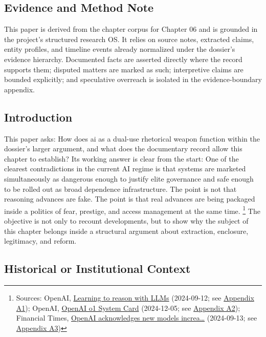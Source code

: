 \documentclass[
  american,
  11pt,
  letterpaper,
]{article}
\begin{document}
\subsection{Evidence and Method Note}\label{evidence-and-method-note-6}

This paper is derived from the chapter corpus for Chapter 06 and is
grounded in the project's structured research OS. It relies on source
notes, extracted claims, entity profiles, and timeline events already
normalized under the dossier's evidence hierarchy. Documented facts are
asserted directly where the record supports them; disputed matters are
marked as such; interpretive claims are bounded explicitly; and
speculative overreach is isolated in the evidence-boundary appendix.

\subsection{Introduction}\label{introduction-6}

This paper asks: How does ai as a dual-use rhetorical weapon function
within the dossier's larger argument, and what does the documentary
record allow this chapter to establish? Its working answer is clear from
the start: One of the clearest contradictions in the current AI regime
is that systems are marketed simultaneously as dangerous enough to
justify elite governance and safe enough to be rolled out as broad
dependence infrastructure. The point is not that reasoning advances are
fake. The point is that real advances are being packaged inside a
politics of fear, prestige, and access management at the same time.
\footnote{Sources: OpenAI,
  \href{https://openai.com/index/learning-to-reason-with-llms/}{Learning
  to reason with LLMs} (2024-09-12; see
  \hyperref[ch-06-appendix-a1-learning-to-reason-with-llms]{Appendix
  A1}); OpenAI,
  \href{https://openai.com/index/openai-o1-system-card/}{OpenAI o1
  System Card} (2024-12-05; see
  \hyperref[ch-06-appendix-a2-openai-o1-system-card]{Appendix A2});
  Financial Times,
  \href{https://www.ft.com/content/37ba7236-2a64-4807-b1e1-7e21ee7d0914}{OpenAI
  acknowledges new models increa\ldots{}} (2024-09-13; see
  \hyperref[ch-06-appendix-a3-openai-acknowledges-new-models-increase-risk-of-misuse-to-create-bioweapons]{Appendix
  A3})} The objective is not only to recount developments, but to show
why the subject of this chapter belongs inside a structural argument
about extraction, enclosure, legitimacy, and reform.

\subsection{Historical or Institutional
Context}\label{historical-or-institutional-context-6}
\end{document}
